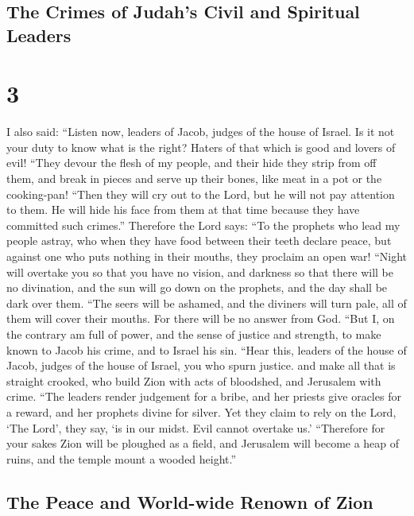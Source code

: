 \hypertarget{the-crimes-of-judahs-civil-and-spiritual-leaders}{%
\subsection{The Crimes of Judah's Civil and Spiritual
Leaders}\label{the-crimes-of-judahs-civil-and-spiritual-leaders}}

\hypertarget{section-2}{%
\section{3}\label{section-2}}

 I also said: ``Listen now, leaders of Jacob, judges of the
house of Israel. Is it not your duty to know what is the right?
 Haters of that which is good and lovers of evil!
 ``They devour the flesh of my people, and their hide they
strip from off them, and break in pieces and serve up their bones, like
meat in a pot or the cooking-pan!  ``Then they will cry out
to the Lord, but he will not pay attention to them. He will hide his
face from them at that time because they have committed such crimes.''
 Therefore the Lord says: ``To the prophets who lead my
people astray, who when they have food between their teeth declare
peace, but against one who puts nothing in their mouths, they proclaim
an open war!  ``Night will overtake you so that you have no
vision, and darkness so that there will be no divination, and the sun
will go down on the prophets, and the day shall be dark over them.
 ``The seers will be ashamed, and the diviners will turn
pale, all of them will cover their mouths. For there will be no answer
from God.  ``But I, on the contrary am full of power, and
the sense of justice and strength, to make known to Jacob his crime, and
to Israel his sin.  ``Hear this, leaders of the house of
Jacob, judges of the house of Israel, you who spurn justice. and make
all that is straight crooked,  who build Zion with acts of
bloodshed, and Jerusalem with crime.  ``The leaders render
judgement for a bribe, and her priests give oracles for a reward, and
her prophets divine for silver. Yet they claim to rely on the Lord, `The
Lord', they say, `is in our midst. Evil cannot overtake us.'
 ``Therefore for your sakes Zion will be ploughed as a
field, and Jerusalem will become a heap of ruins, and the temple mount a
wooded height.''

\hypertarget{the-peace-and-world-wide-renown-of-zion}{%
\subsection{The Peace and World-wide Renown of
Zion}\label{the-peace-and-world-wide-renown-of-zion}}

